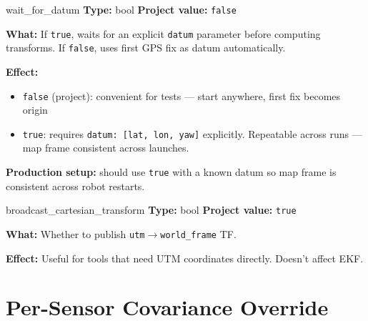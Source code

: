 \documentclass[11pt,a4paper]{article}
\begin{document}
\begin{paramcard}{wait\_for\_datum}
\textbf{Type:} bool \quad \textbf{Project value:} \texttt{false}

\textbf{What:} If \texttt{true}, waits for an explicit \texttt{datum} parameter before computing transforms. If \texttt{false}, uses first GPS fix as datum automatically.

\textbf{Effect:}
\begin{itemize}
\item \texttt{false} (project): convenient for tests --- start anywhere, first fix becomes origin
\item \texttt{true}: requires \texttt{datum: [lat, lon, yaw]} explicitly. Repeatable across runs --- map frame consistent across launches.
\end{itemize}

\textbf{Production setup:} should use \texttt{true} with a known datum so map frame is consistent across robot restarts.
\end{paramcard}

\begin{paramcard}{broadcast\_cartesian\_transform}
\textbf{Type:} bool \quad \textbf{Project value:} \texttt{true}

\textbf{What:} Whether to publish \texttt{utm}$\to$\texttt{world\_frame} TF.

\textbf{Effect:} Useful for tools that need UTM coordinates directly. Doesn't affect EKF.
\end{paramcard}

\section{Per-Sensor Covariance Override}
\end{document}
